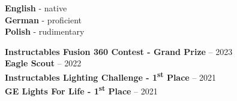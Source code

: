 \documentclass[9pt]{developercv} %
\begin{document}
\begin{minipage}[t]{0.3\textwidth}
	\vspace{-\baselineskip} %

	
	\textbf{English} - native\\
	\textbf{German} - proficient\\
	\textbf{Polish} - rudimentary
\end{minipage}
\hfill
\begin{minipage}[t]{0.6\textwidth}
	\vspace{-\baselineskip} %
	
	
	\textbf{Instructables Fusion 360 Contest - Grand Prize} -- 2023\\
	\textbf{Eagle Scout} -- 2022\\
	\textbf{Instructables Lighting Challenge - 1\textsuperscript{st} Place} -- 2021\\
	\textbf{GE Lights For Life - 1\textsuperscript{st} Place} -- 2021\\
\end{minipage}

\vspace{\baselineskip}

\end{document}
